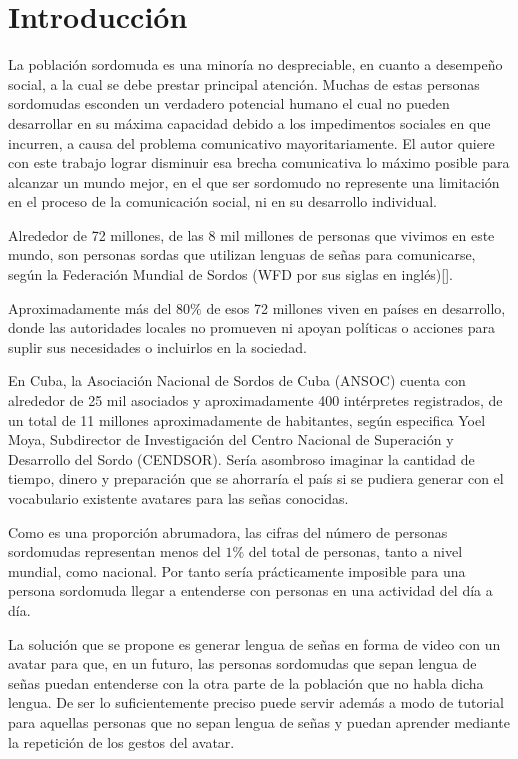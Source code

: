 \chapter*{Introducción}\label{chapter:introduction}

La población sordomuda es una minoría no despreciable, en cuanto a desempeño social, a la cual se debe prestar principal atención. Muchas de estas personas sordomudas esconden un verdadero potencial humano el cual no pueden desarrollar en su máxima capacidad debido a los impedimentos sociales en que incurren, a causa del problema comunicativo mayoritariamente. El autor quiere con este trabajo lograr disminuir esa brecha comunicativa lo máximo posible para alcanzar un mundo mejor, en el que ser sordomudo no represente una limitación en el proceso de la comunicación social, ni en su desarrollo individual.

Alrededor de 72 millones, de las 8 mil millones de personas que vivimos en este mundo, son personas sordas que utilizan lenguas de señas para comunicarse, según la Federación Mundial de Sordos (WFD por sus siglas en inglés)[\cite{without_sign_language_deaf_people_are_not_equal_2019}].

Aproximadamente más del $80\%$ de esos 72 millones viven en países en desarrollo, donde las autoridades locales no promueven ni apoyan políticas o acciones para suplir sus necesidades o incluirlos en la sociedad.

En Cuba, la Asociación Nacional de Sordos de Cuba (ANSOC) cuenta con alrededor de 25 mil asociados y aproximadamente 400 intérpretes registrados, de un total de 11 millones aproximadamente de habitantes, según especifica Yoel Moya, Subdirector de Investigación del Centro Nacional de Superación y Desarrollo del Sordo (CENDSOR). Sería asombroso imaginar la cantidad de tiempo, dinero y preparación que se ahorraría el país si se pudiera generar con el vocabulario existente avatares para las señas conocidas.

Como es una proporción abrumadora, las cifras del número de personas sordomudas representan menos del $1\%$ del total de personas, tanto a nivel mundial, como nacional. Por tanto sería prácticamente imposible para una persona sordomuda llegar a entenderse con personas en una actividad del día a día.

 La solución que se propone es generar lengua de señas en forma de video con un avatar para que, en un futuro, las personas sordomudas que sepan lengua de señas puedan entenderse con la otra parte de la población que no habla dicha lengua. De ser lo suficientemente preciso puede servir además a modo de tutorial para aquellas personas que no sepan lengua de señas y puedan aprender mediante la repetición de los gestos del avatar.

